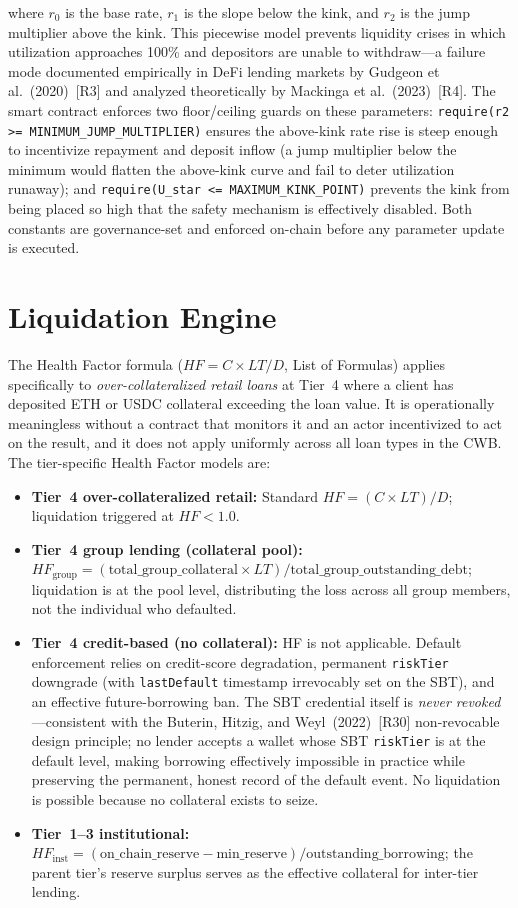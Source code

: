 \documentclass[12pt,a4paper]{report}
\begin{document}
where $r_0$ is the base rate, $r_1$ is the slope below the kink, and $r_2$ is the jump multiplier above the kink. This piecewise model prevents liquidity crises in which utilization approaches 100\% and depositors are unable to withdraw---a failure mode documented empirically in DeFi lending markets by Gudgeon et al.~(2020)~[R3] and analyzed theoretically by Mackinga et al.~(2023)~[R4]. The smart contract enforces two floor/ceiling guards on these parameters: \texttt{require(r2 >= MINIMUM\_JUMP\_MULTIPLIER)} ensures the above-kink rate rise is steep enough to incentivize repayment and deposit inflow (a jump multiplier below the minimum would flatten the above-kink curve and fail to deter utilization runaway); and \texttt{require(U\_star <= MAXIMUM\_KINK\_POINT)} prevents the kink from being placed so high that the safety mechanism is effectively disabled. Both constants are governance-set and enforced on-chain before any parameter update is executed.

\section{Liquidation Engine}
\label{sec:liquidation}

The Health Factor formula ($HF = C \times LT / D$, List of Formulas) applies specifically to \textit{over-collateralized retail loans} at Tier~4 where a client has deposited ETH or USDC collateral exceeding the loan value. It is operationally meaningless without a contract that monitors it and an actor incentivized to act on the result, and it does not apply uniformly across all loan types in the CWB. The tier-specific Health Factor models are:

\begin{itemize}[noitemsep]
\item \textbf{Tier~4 over-collateralized retail:} Standard $HF = (C \times LT) / D$; liquidation triggered at $HF < 1.0$.
\item \textbf{Tier~4 group lending (collateral pool):} $HF_{\text{group}} = (\text{total\_group\_collateral} \times LT) / \text{total\_group\_outstanding\_debt}$; liquidation is at the pool level, distributing the loss across all group members, not the individual who defaulted.
\item \textbf{Tier~4 credit-based (no collateral):} HF is not applicable. Default enforcement relies on credit-score degradation, permanent \texttt{riskTier} downgrade (with \texttt{lastDefault} timestamp irrevocably set on the SBT), and an effective future-borrowing ban. The SBT credential itself is \textit{never revoked}---consistent with the Buterin, Hitzig, and Weyl~(2022)~[R30] non-revocable design principle; no lender accepts a wallet whose SBT \texttt{riskTier} is at the default level, making borrowing effectively impossible in practice while preserving the permanent, honest record of the default event. No liquidation is possible because no collateral exists to seize.
\item \textbf{Tier~1--3 institutional:} $HF_{\text{inst}} = (\text{on\_chain\_reserve} - \text{min\_reserve}) / \text{outstanding\_borrowing}$; the parent tier's reserve surplus serves as the effective collateral for inter-tier lending.
\end{itemize}
\end{document}

